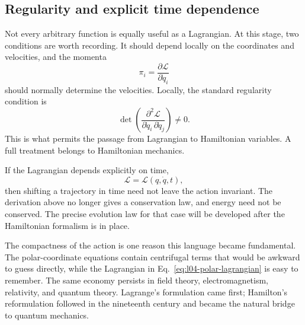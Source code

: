 \subsection{Regularity and explicit time dependence}

Not every arbitrary function is equally useful as a Lagrangian. At this
stage, two conditions are worth recording. It should depend locally on the
coordinates and velocities, and the momenta
\begin{equation}
 \pi_i=\frac{\partial\mathcal L}{\partial\dot q_i}
\end{equation}
should normally determine the velocities. Locally, the standard regularity
condition is
\begin{equation}
 \det\left(
 \frac{\partial^2\mathcal L}
 {\partial\dot q_i\,\partial\dot q_j}
 \right)\neq0.
 \label{eq:l04-regular-lagrangian}
\end{equation}
This is what permits the passage from Lagrangian to Hamiltonian variables. A
full treatment belongs to Hamiltonian mechanics.

If the Lagrangian depends explicitly on time,
\begin{equation}
 \mathcal L=\mathcal L(q,\dot q,t),
\end{equation}
then shifting a trajectory in time need not leave the action invariant. The
derivation above no longer gives a conservation law, and energy need not be
conserved. The precise evolution law for that case will be developed after
the Hamiltonian formalism is in place.

\begin{classroomqa}
\end{classroomqa}

The compactness of the action is one reason this language became fundamental.
The polar-coordinate equations contain centrifugal terms that would be awkward
to guess directly, while the Lagrangian in
Eq.~\eqref{eq:l04-polar-lagrangian} is easy to remember. The same economy
persists in field theory, electromagnetism, relativity, and quantum theory.
Lagrange's formulation came first; Hamilton's reformulation followed in the
nineteenth century and became the natural bridge to quantum mechanics.

